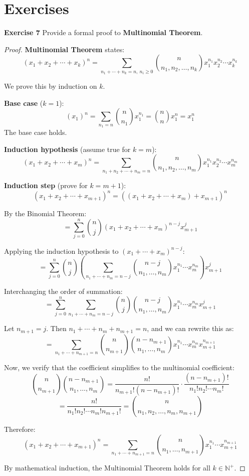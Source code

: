 \documentclass[a4paper]{article}
\begin{document}
\section{Exercises}
\noindent \textbf{Exercise 7}  Provide a formal proof to \textbf{Multinomial Theorem}.
\begin{proof}
\textbf{Multinomial Theorem} states:
$$(x_1 + x_2 + \cdots + x_k)^n = \sum_{n_1+\cdots +n_k = n, \ n_i \geq 0} \binom{n}{n_1, n_2, \ldots, n_k}x_{1}^{n_{1}}x_{2}^{n_{2}}\cdots x_{k}^{n_{k}}$$

We prove this by induction on $k$.

\textbf{Base case} ($k=1$): 
$$(x_1)^n = \sum_{n_1 = n} \binom{n}{n_1} x_1^{n_1} = \binom{n}{n} x_1^n = x_1^n$$
The base case holds.

\textbf{Induction hypothesis} (assume true for $k=m$):
$$(x_1 + x_2 + \cdots + x_m)^n = \sum_{n_1 + n_2 + \cdots + n_m = n} \binom{n}{n_1, n_2, \ldots, n_m} x_1^{n_1} x_2^{n_2} \cdots x_m^{n_m}$$

\textbf{Induction step} (prove for $k=m+1$):
$$(x_1 + x_2 + \cdots + x_{m+1})^n = ((x_1 + x_2 + \cdots + x_m) + x_{m+1})^n$$

By the Binomial Theorem:
$$= \sum_{j=0}^{n} \binom{n}{j} (x_1 + x_2 + \cdots + x_m)^{n-j} x_{m+1}^j$$

Applying the induction hypothesis to $(x_1 + \cdots + x_m)^{n-j}$:
$$= \sum_{j=0}^{n} \binom{n}{j} \left(\sum_{n_1 + \cdots + n_m = n-j} \binom{n-j}{n_1, \ldots, n_m} x_1^{n_1} \cdots x_m^{n_m}\right) x_{m+1}^j$$

Interchanging the order of summation:
$$= \sum_{j=0}^{n} \sum_{n_1 + \cdots + n_m = n-j} \binom{n}{j} \binom{n-j}{n_1, \ldots, n_m} x_1^{n_1} \cdots x_m^{n_m} x_{m+1}^j$$

Let $n_{m+1} = j$. Then $n_1 + \cdots + n_m + n_{m+1} = n$, and we can rewrite this as:
$$= \sum_{n_1 + \cdots + n_{m+1} = n} \binom{n}{n_{m+1}} \binom{n - n_{m+1}}{n_1, \ldots, n_m} x_1^{n_1} \cdots x_m^{n_m} x_{m+1}^{n_{m+1}}$$

Now, we verify that the coefficient simplifies to the multinomial coefficient:
$$\binom{n}{n_{m+1}} \binom{n-n_{m+1}}{n_1, \ldots, n_m} = \frac{n!}{n_{m+1}! (n - n_{m+1})!} \cdot \frac{(n-n_{m+1})!}{n_1! n_2! \cdots n_m!}$$
$$= \frac{n!}{n_1! n_2! \cdots n_m! n_{m+1}!} = \binom{n}{n_1, n_2, \ldots, n_m, n_{m+1}}$$

Therefore:
$$(x_1 + x_2 + \cdots + x_{m+1})^n = \sum_{n_1 + \cdots + n_{m+1} = n} \binom{n}{n_1, \ldots, n_{m+1}} x_1^{n_1} \cdots x_{m+1}^{n_{m+1}}$$

By mathematical induction, the Multinomial Theorem holds for all $k \in \mathbb{N}^+$.
\end{proof}
\end{document}
